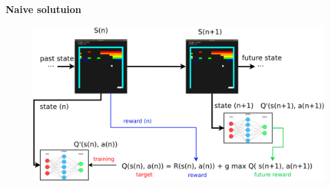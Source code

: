 \documentclass[xcolor=dvipsnames]{beamer}
\begin{document}
\begin{frame}{\bf Naive solutuion}

\begin{figure}
  \includegraphics[scale=0.25]{./diagrams/dqn_naive.png}
\end{figure}

\end{frame}
\end{document}
